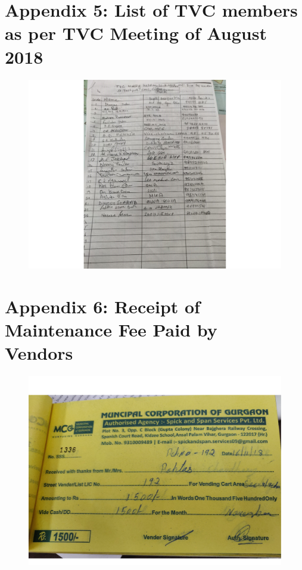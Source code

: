 \documentclass[a4paper, 12pt, twoside]{article}
\begin{document}
{{\section*{Appendix 5: List of TVC members as per TVC Meeting of August 2018}
\begin{figure}[h]
\centering
\includegraphics[width=7in]{ListofTVC.pdf}
\end{figure}

\newpage
\section*{Appendix 6: Receipt of Maintenance Fee Paid by \\Vendors}
\begin{figure}[h]
\centering
\includegraphics[width=6in]{Receipt1.pdf}
\end{figure}

}}
\end{document}

